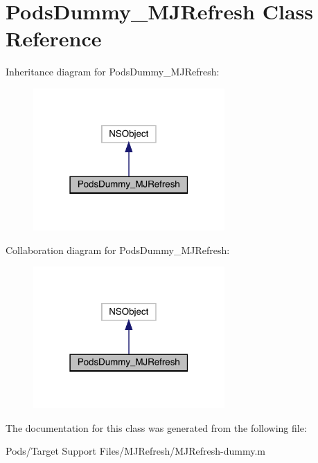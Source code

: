 \hypertarget{interface_pods_dummy___m_j_refresh}{}\section{Pods\+Dummy\+\_\+\+M\+J\+Refresh Class Reference}
\label{interface_pods_dummy___m_j_refresh}


Inheritance diagram for Pods\+Dummy\+\_\+\+M\+J\+Refresh\+:\nopagebreak
\begin{figure}[H]
\begin{center}
\leavevmode
\includegraphics[width=207pt]{interface_pods_dummy___m_j_refresh__inherit__graph}
\end{center}
\end{figure}


Collaboration diagram for Pods\+Dummy\+\_\+\+M\+J\+Refresh\+:\nopagebreak
\begin{figure}[H]
\begin{center}
\leavevmode
\includegraphics[width=207pt]{interface_pods_dummy___m_j_refresh__coll__graph}
\end{center}
\end{figure}


The documentation for this class was generated from the following file\+:\begin{DoxyCompactItemize}
\item 
Pods/\+Target Support Files/\+M\+J\+Refresh/M\+J\+Refresh-\/dummy.\+m\end{DoxyCompactItemize}
